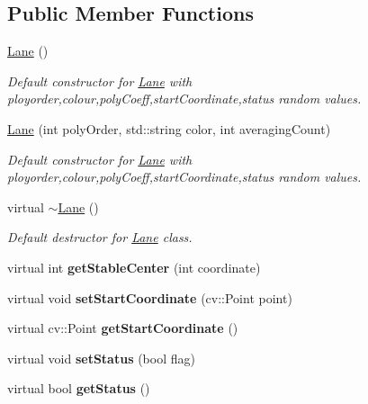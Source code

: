 \subsection*{Public Member Functions}
\begin{DoxyCompactItemize}
\item 
\hyperlink{classLane_affd642d537d96c03cb7fe8c8d46d37b4}{Lane} ()
\begin{DoxyCompactList}\small\item\em Default constructor for \hyperlink{classLane}{Lane} with ployorder,colour,poly\+Coeff,start\+Coordinate,status random values. \end{DoxyCompactList}\item 
\hyperlink{classLane_a7dac966c4a38ff5440e70b2be72aa5ac}{Lane} (int poly\+Order, std\+::string color, int averaging\+Count)
\begin{DoxyCompactList}\small\item\em Default constructor for \hyperlink{classLane}{Lane} with ployorder,colour,poly\+Coeff,start\+Coordinate,status random values. \end{DoxyCompactList}\item 
virtual \hyperlink{classLane_afa3175d83b754b60cc0a93f26accb5ad}{$\sim$\+Lane} ()
\begin{DoxyCompactList}\small\item\em Default destructor for \hyperlink{classLane}{Lane} class. \end{DoxyCompactList}\item 
virtual int {\bfseries get\+Stable\+Center} (int coordinate)\hypertarget{classLane_ac01d392e49e9670619a2b96fa44fecb5}{}\label{classLane_ac01d392e49e9670619a2b96fa44fecb5}

\item 
virtual void {\bfseries set\+Start\+Coordinate} (cv\+::\+Point point)\hypertarget{classLane_aba443bb3b0c099251452bb1af50eb9d0}{}\label{classLane_aba443bb3b0c099251452bb1af50eb9d0}

\item 
virtual cv\+::\+Point {\bfseries get\+Start\+Coordinate} ()\hypertarget{classLane_aff2f8fddf9cc5dce9c8213cc2e753985}{}\label{classLane_aff2f8fddf9cc5dce9c8213cc2e753985}

\item 
virtual void {\bfseries set\+Status} (bool flag)\hypertarget{classLane_af24e848d029b62c024586e305f38b8c9}{}\label{classLane_af24e848d029b62c024586e305f38b8c9}

\item 
virtual bool {\bfseries get\+Status} ()\hypertarget{classLane_a30d25498948672ea094316de8d34431f}{}\label{classLane_a30d25498948672ea094316de8d34431f}


\end{DoxyCompactItemize}
